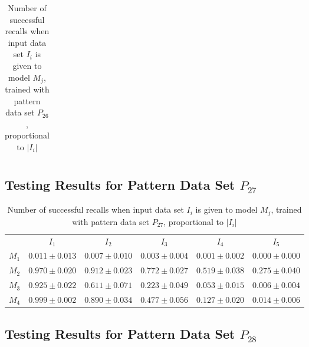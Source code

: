 \documentclass[12pt]{article}
\begin{document}
\begin{appendices}
\begin{table}[H]
\begin{tabular}{cccccc}
    \end{tabular}
    \caption{Number of successful recalls when input data set $I_i$ is given to model $M_j$, trained with pattern data set $P_{26}$, proportional to $\left|I_i\right|$}
    \end{table}
    
\subsection{Testing Results for Pattern Data Set $P_{27}$}


    \begin{table}[H]
    \centering
    \def\arraystretch{1.5}
    \footnotesize
    \begin{tabular}{cccccc}
    
 & $I_{1}$  & $I_{2}$  & $I_{3}$  & $I_{4}$  & $I_{5}$ \\ \cline{2-6}
$M_{1}$  & $0.011\pm0.013$  & $0.007\pm0.010$  & $0.003\pm0.004$  & $0.001\pm0.002$  & $0.000\pm0.000$ \\
$M_{2}$  & $0.970\pm0.020$  & $0.912\pm0.023$  & $0.772\pm0.027$  & $0.519\pm0.038$  & $0.275\pm0.040$ \\
$M_{3}$  & $0.925\pm0.022$  & $0.611\pm0.071$  & $0.223\pm0.049$  & $0.053\pm0.015$  & $0.006\pm0.004$ \\
$M_{4}$  & $0.999\pm0.002$  & $0.890\pm0.034$  & $0.477\pm0.056$  & $0.127\pm0.020$  & $0.014\pm0.006$ \\

    \end{tabular}
    \caption{Number of successful recalls when input data set $I_i$ is given to model $M_j$, trained with pattern data set $P_{27}$, proportional to $\left|I_i\right|$}
    \end{table}
    
\subsection{Testing Results for Pattern Data Set $P_{28}$}


    \begin{table}[H]
    \centering
    \def\arraystretch{1.5}
    \footnotesize
    \begin{tabular}{cccccc}
    

\end{tabular}
\end{table}
\end{appendices}
\end{document}
